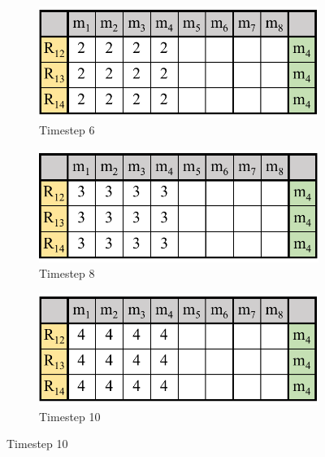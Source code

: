 \begin{figure}[t]
    \centering
    \begin{subfigure}[b]{0.3\columnwidth}
         \centering
         \includegraphics[width=\textwidth]{fail-quack1.pdf}
         \caption{Timestep 6}
         \label{ssfig:init-ack}
     \end{subfigure}
     \begin{subfigure}[b]{0.3\columnwidth}
         \centering
         \includegraphics[width=\textwidth]{fail-quack2.pdf}
         \caption{Timestep 8}
         \label{ssfig:first-ack}
     \end{subfigure}
     \begin{subfigure}[b]{0.3\columnwidth}
         \centering
         \includegraphics[width=\textwidth]{fail-quack3.pdf}
         \caption{Timestep 10}
         \label{ssfig:second-ack}
     \end{subfigure}


\end{figure}
